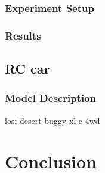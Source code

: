\subsection{Experiment Setup}
\subsection{Results}

\section{RC car}
\subsection{Model Description}
losi desert buggy xl-e 4wd




\chapter{Conclusion}






